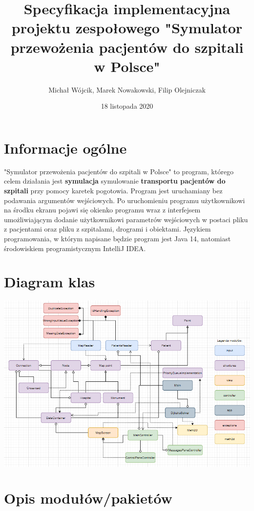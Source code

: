 \documentclass{article}
\title{Specyfikacja implementacyjna projektu zespołowego "Symulator przewożenia pacjentów do szpitali w Polsce"}
\author{Michał Wójcik, Marek Nowakowski, Filip Olejniczak}
\date{18 listopada 2020}
\begin{document}
\maketitle

\tableofcontents
\pagebreak

\section{Informacje ogólne}
    "Symulator przewożenia pacjentów do szpitali w Polsce" to program, którego celem działania jest \textbf{symulacja} symulowanie \textbf{transportu pacjentów do szpitali} przy pomocy karetek pogotowia. Program jest uruchamiany bez podawania argumentów wejściowych. Po uruchomieniu programu użytkownikowi na środku ekranu pojawi się okienko programu wraz z interfejsem umożliwiającym dodanie użytkownikowi parametrów wejściowych w postaci pliku z pacjentami oraz pliku z szpitalami, drogrami i obiektami. Językiem programowania, w którym napisane będzie program jest Java 14, natomiast środowiskiem programistycznym IntelliJ IDEA.

\section{Diagram klas}

    \begin{center}
        \includegraphics[scale=0.45]{diagramKlas.png}
    \end{center}

\section{Opis modułów/pakietów}
\end{document}
